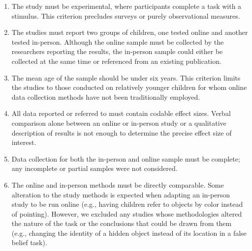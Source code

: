 \documentclass[
  man,floatsintext]{apa6}
\begin{document}
\begin{enumerate}
\def\labelenumi{\arabic{enumi}.}
\item
  The study must be experimental, where participants complete a task with a stimulus. This criterion precludes surveys or purely observational measures.
\item
  The studies must report two groups of children, one tested online and another tested in-person. Although the online sample must be collected by the researchers reporting the results, the in-person sample could either be collected at the same time or referenced from an existing publication.
\item
  The mean age of the sample should be under six years. This criterion limits the studies to those conducted on relatively younger children for whom online data collection methods have not been traditionally employed.
\item
  All data reported or referred to must contain codable effect sizes. Verbal comparison alone between an online or in-person study or a qualitative description of results is not enough to determine the precise effect size of interest.
\item
  Data collection for both the in-person and online sample must be complete; any incomplete or partial samples were not considered.
\item
  The online and in-person methods must be directly comparable. Some alteration to the study methods is expected when adapting an in-person study to be run online (e.g., having children refer to objects by color instead of pointing). However, we excluded any studies whose methodologies altered the nature of the task or the conclusions that could be drawn from them (e.g., changing the identity of a hidden object instead of its location in a false belief task).
\end{enumerate}
\end{document}
